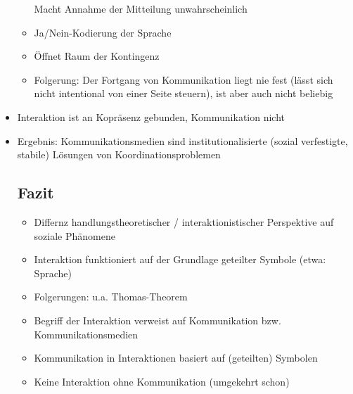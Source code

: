 \documentclass{scrartcl}
\begin{document}
\begin{itemize}
\begin{itemize}
                Macht Annahme der Mitteilung unwahrscheinlich
            \item
                Ja/Nein-Kodierung der Sprache
            \item
                Öffnet Raum der Kontingenz
            \item
                Folgerung: Der Fortgang von Kommunikation liegt nie fest (lässt sich nicht intentional von einer Seite steuern), ist aber auch nicht beliebig
        \end{itemize}
    \item
        Interaktion ist an Kopräsenz gebunden, Kommunikation nicht
    \item
        Ergebnis: Kommunikationsmedien sind institutionalisierte (sozial verfestigte, stabile) Lösungen von Koordinationsproblemen
\subsection*{Fazit}
    \begin{itemize}
        \item
            Differnz handlungstheoretischer / interaktionistischer Perspektive auf soziale Phänomene
        \item
            Interaktion funktioniert auf der Grundlage geteilter Symbole (etwa: Sprache)
        \item
            Folgerungen: u.a. Thomas-Theorem
        \item
            Begriff der Interaktion verweist auf Kommunikation bzw. Kommunikationsmedien
        \item
            Kommunikation in Interaktionen basiert auf (geteilten) Symbolen
        \item
            Keine Interaktion ohne Kommunikation (umgekehrt schon)
    \end{itemize}
\end{itemize}
\end{document}
